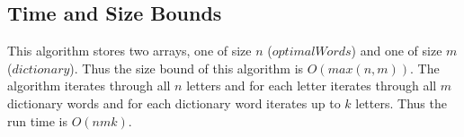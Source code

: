 \documentclass[11pt]{article}
\begin{document}
\subsection*{Time and Size Bounds}
This algorithm stores two arrays, one of size $n$ ($optimalWords$) and one of size $m$ ($dictionary$). Thus the size bound of this algorithm is $O(max(n,m))$. The algorithm iterates through all $n$ letters and for each letter iterates through all $m$ dictionary words and for each dictionary word iterates up to $k$ letters. Thus the run time is $O(nmk)$.
\end{document}
